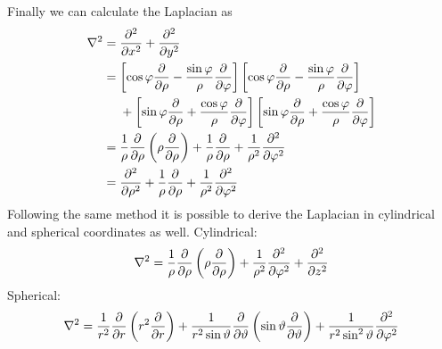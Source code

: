 \documentclass{article}
\begin{document}
    Finally we can calculate the Laplacian as
    \begin{align*}
        \laplacian &= \pdv[2]{x} + \pdv[2]{y}\\
        &= \left[\cos\varphi\pdv{\rho} - \frac{\sin\varphi}{\rho}\pdv{\varphi}\right]\left[\cos\varphi\pdv{\rho} - \frac{\sin\varphi}{\rho}\pdv{\varphi}\right]\\
        &\hphantom{=|} + \left[\sin\varphi\pdv{\rho} + \frac{\cos\varphi}{\rho}\pdv{\varphi}\right]\left[\sin\varphi\pdv{\rho} + \frac{\cos\varphi}{\rho}\pdv{\varphi}\right]\\
        &= \frac{1}{\rho}\pdv{\rho}\left(\rho\pdv{\rho}\right) + \frac{1}{\rho}\pdv{\rho} + \frac{1}{\rho^2}\pdv[2]{\varphi}\\
        &= \pdv[2]{\rho} + \frac{1}{\rho}\pdv{\rho} + \frac{1}{\rho^2}\pdv[2]{\varphi}
    \end{align*}
    Following the same method it is possible to derive the Laplacian in cylindrical and spherical coordinates as well.
    Cylindrical:
    \[\laplacian = \frac{1}{\rho} \pdv{\rho} \left(\rho\pdv{\rho}\right) + \frac{1}{\rho^2} \pdv[2]{\varphi} + \pdv[2]{z}\]
    Spherical:
    \[\laplacian = \frac{1}{r^2}\pdv{r}\left(r^2\pdv{r}\right) + \frac{1}{r^2\sin\vartheta} \pdv{\vartheta} \left(\sin\vartheta\pdv{\vartheta}\right) + \frac{1}{r^2\sin^2\vartheta}\pdv[2]{\varphi}\]
\end{document}
